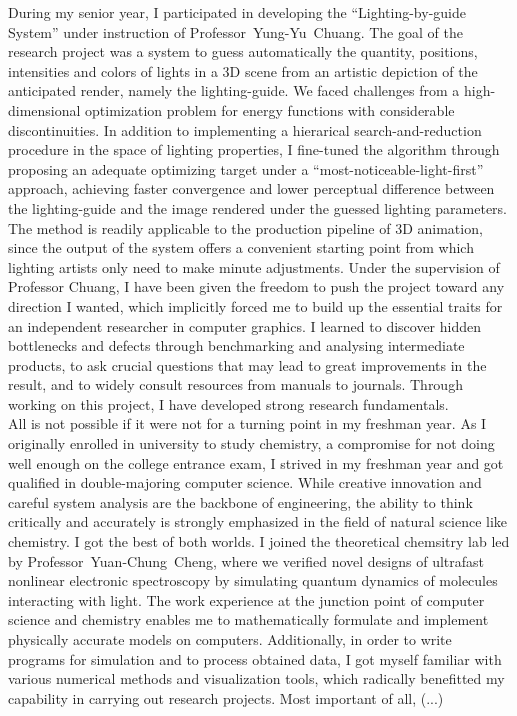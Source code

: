 \documentclass[a4paper, 12pt]{article}
\begin{document}
During my senior year, I participated in developing the ``Lighting-by-guide System'' under instruction of Professor~Yung-Yu~Chuang. The goal of the research project was a system to guess automatically the quantity, positions, intensities and colors of lights in a 3D scene from an artistic depiction of the anticipated render, namely the lighting-guide. We faced challenges from a high-dimensional optimization problem for energy functions with considerable discontinuities. In addition to implementing a hierarical search-and-reduction procedure in the space of lighting properties, I fine-tuned the algorithm through proposing an adequate optimizing target under a ``most-noticeable-light-first'' approach, achieving faster convergence and lower perceptual difference between the lighting-guide and the image rendered under the guessed lighting parameters. The method is readily applicable to the production pipeline of 3D animation, since the output of the system offers a convenient starting point from which lighting artists only need to make minute adjustments. Under the supervision of Professor Chuang, I have been given the freedom to push the project toward any direction I wanted, which implicitly forced me to build up the essential traits for an independent researcher in computer graphics. I learned to discover hidden bottlenecks and defects through benchmarking and analysing intermediate products, to ask crucial questions that may lead to great improvements in the result, and to widely consult resources from manuals to journals. Through working on this project, I have developed strong research fundamentals.\\


All is not possible if it were not for a turning point in my freshman year. As I originally enrolled in university to study chemistry, a compromise for not doing well enough on the college entrance exam, I strived in my freshman year and got qualified in double-majoring computer science. While creative innovation and careful system analysis are the backbone of engineering, the ability to think critically and accurately is strongly emphasized in the field of natural science like chemistry. I got the best of both worlds. I joined the theoretical chemsitry lab led by Professor~Yuan-Chung~Cheng, where we verified novel designs of ultrafast nonlinear electronic spectroscopy by simulating quantum dynamics of molecules interacting with light. The work experience at the junction point of computer science and chemistry enables me to mathematically formulate and implement physically accurate models on computers. Additionally, in order to write programs for simulation and to process obtained data, I got myself familiar with various numerical methods and visualization tools, which radically benefitted my capability in carrying out research projects. Most important of all, (...)\\
 
\end{document}
